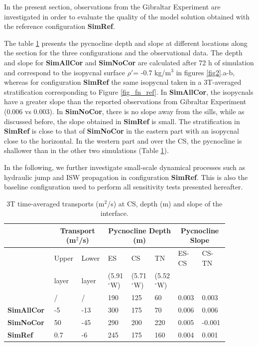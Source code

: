 \indent In the present section, observations from the Gibraltar Experiment \citep{FA1988} are investigated in order to evaluate the quality of the model solution obtained with the reference configuration \textbf{SimRef}.

The table \ref{tabdepth} presents the pycnocline depth and slope at different locations along the section for the three configurations and the observational data. The depth and slope for \textbf{SimAllCor} and \textbf{SimNoCor} are calculated after 72 h of simulation and correspond to the isopycnal surface $\rho'$= -0.7 kg/m$^3$ in figures \ref{fig2}.a-b, whereas for configuration \textbf{SimRef} the same isopycnal taken in a 3T-averaged stratification corresponding to Figure \ref{fig_fn_ref}. In \textbf{SimAllCor}, the isopycnals have a greater slope than the reported observations from Gibraltar Experiment (0.006 vs 0.003). In \textbf{SimNoCor}, there is no slope away from the sills, while as discussed before, the slope obtained in \textbf{SimRef} is small. The stratification in \textbf{SimRef} is close to that of \textbf{SimNoCor} in the eastern part with an isopycnal close to the horizontal. In the western part and over the CS, the pycnocline is shallower than in the other two simulations (Table \ref{tabdepth}).

In the following, we further investigate small-scale dynamical processes such as hydraulic jump and ISW propagation in configuration \textbf{SimRef}. This is also the baseline configuration used to perform all sensitivity tests presented hereafter.

\begin{table}[!h]
 \caption{3T time-averaged transports (m$^2$/s) at CS, depth (m) and slope of the interface.}
 \centering
  \begin{tabular}{|p{0.2\linewidth}|p{0.1\linewidth}|p{0.1\linewidth}||p{0.1\linewidth}|p{0.1\linewidth}|p{0.1\linewidth}||p{0.09\linewidth}|p{0.09\linewidth}|}
 \hline
 &\multicolumn{2}{c||}{Transport (m$^2$/s)} & \multicolumn{3}{c||}{Pycnocline Depth (m)} & \multicolumn{2}{c|}{Pycnocline Slope}\\
  \hline
   &Upper  & Lower & ES & CS & TN& ES-CS & CS-TN\\
    &layer &layer &(5.91$^\circ$W)&(5.71$^\circ$W)&(5.52$^\circ$W)& & \\
   \hline
   \citet{FA1988} & / & / & 190  & 125 & 60 & 0.003 & 0.003\\
   \hline
   \textbf{SimAllCor} & -5 & -13 & 300 & 175 & 70 & 0.006 & 0.006\\
   \hline
   \textbf{SimNoCor} & 50 & -45 & 290  & 200 & 220& 0.005 & -0.001\\
   \hline
   \textbf{SimRef} & 0.7& -6 & 245 & 175 & 160 & 0.004 & 0.001\\
  \hline
 \end{tabular}
 \label{tabdepth}
\end{table}

